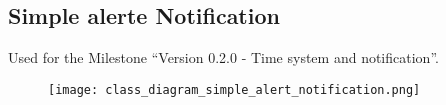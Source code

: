 \subsection{Simple alerte Notification}
Used for the Milestone ``Version 0.2.0 - Time system and notification''.

\begin{figure}[h]
	\centering
	\texttt{[image: class\_diagram\_simple\_alert\_notification.png]}
\end{figure}